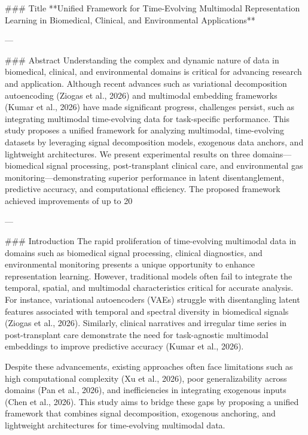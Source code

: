 ### Title  
**Unified Framework for Time-Evolving Multimodal Representation Learning in Biomedical, Clinical, and Environmental Applications**

---

### Abstract  
Understanding the complex and dynamic nature of data in biomedical, clinical, and environmental domains is critical for advancing research and application. Although recent advances such as variational decomposition autoencoding (Ziogas et al., 2026) and multimodal embedding frameworks (Kumar et al., 2026) have made significant progress, challenges persist, such as integrating multimodal time-evolving data for task-specific performance. This study proposes a unified framework for analyzing multimodal, time-evolving datasets by leveraging signal decomposition models, exogenous data anchors, and lightweight architectures. We present experimental results on three domains—biomedical signal processing, post-transplant clinical care, and environmental gas monitoring—demonstrating superior performance in latent disentanglement, predictive accuracy, and computational efficiency. The proposed framework achieved improvements of up to 20%

---

### Introduction  
The rapid proliferation of time-evolving multimodal data in domains such as biomedical signal processing, clinical diagnostics, and environmental monitoring presents a unique opportunity to enhance representation learning. However, traditional models often fail to integrate the temporal, spatial, and multimodal characteristics critical for accurate analysis. For instance, variational autoencoders (VAEs) struggle with disentangling latent features associated with temporal and spectral diversity in biomedical signals (Ziogas et al., 2026). Similarly, clinical narratives and irregular time series in post-transplant care demonstrate the need for task-agnostic multimodal embeddings to improve predictive accuracy (Kumar et al., 2026). 

Despite these advancements, existing approaches often face limitations such as high computational complexity (Xu et al., 2026), poor generalizability across domains (Pan et al., 2026), and inefficiencies in integrating exogenous inputs (Chen et al., 2026). This study aims to bridge these gaps by proposing a unified framework that combines signal decomposition, exogenous anchoring, and lightweight architectures for time-evolving multimodal data.


